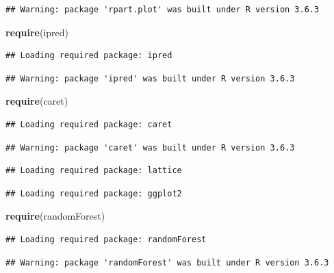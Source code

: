 \documentclass[
]{article}
\newenvironment{Shaded}{\begin{snugshade}}{\end{snugshade}}
\newcommand{\KeywordTok}[1]{\textcolor[rgb]{0.13,0.29,0.53}{\textbf{#1}}}
\newcommand{\NormalTok}[1]{#1}
\begin{document}
\begin{verbatim}
## Warning: package 'rpart.plot' was built under R version 3.6.3
\end{verbatim}

\begin{Shaded}
\begin{Highlighting}[]
\KeywordTok{require}\NormalTok{(ipred)}
\end{Highlighting}
\end{Shaded}

\begin{verbatim}
## Loading required package: ipred
\end{verbatim}

\begin{verbatim}
## Warning: package 'ipred' was built under R version 3.6.3
\end{verbatim}

\begin{Shaded}
\begin{Highlighting}[]
\KeywordTok{require}\NormalTok{(caret)}
\end{Highlighting}
\end{Shaded}

\begin{verbatim}
## Loading required package: caret
\end{verbatim}

\begin{verbatim}
## Warning: package 'caret' was built under R version 3.6.3
\end{verbatim}

\begin{verbatim}
## Loading required package: lattice
\end{verbatim}

\begin{verbatim}
## Loading required package: ggplot2
\end{verbatim}

\begin{Shaded}
\begin{Highlighting}[]
\KeywordTok{require}\NormalTok{(randomForest)}
\end{Highlighting}
\end{Shaded}

\begin{verbatim}
## Loading required package: randomForest
\end{verbatim}

\begin{verbatim}
## Warning: package 'randomForest' was built under R version 3.6.3
\end{verbatim}
\end{document}

